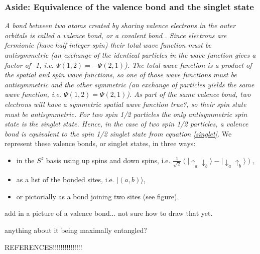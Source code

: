 \subsubsection{Aside: Equivalence of the valence bond and the singlet state}
{\it{A bond between two atoms created by sharing valence electrons in the outer orbitals is called a valence bond, or a covalent bond \cite{Slater1931,Pauling1933}.
Since electrons are fermionic (have half integer spin) their total
wave function must be antisymmetric (an exchange of the identical particles in the wave function
gives a factor of -1, i.e. $\Psi(1,2) = -\Psi(2,1)$).
The total wave function is a product of the spatial and spin wave functions, so one of those wave functions must be antisymmetric and the other symmetric (an exchange of particles yields the same wave function, i.e. $\Psi(1,2) = \Psi(2,1)$).
As part of the same valence bond, two electrons will have a symmetric spatial wave function {\color{red} true?}, so their spin state must be antisymmetric.  For two spin 1/2 particles the only antisymmetric spin state is the singlet state.  
Hence, in the case of two spin 1/2 particles, a valence bond is equivalent to the spin 1/2 singlet state from equation \eqref{singlet}.}}
We represent these valence bonds, or singlet states, in three ways: 
\begin{itemize}
\item{in the $S^z$ basis using up spins and down spins, 
i.e. $\tfrac{1}{\sqrt{2}}( \lvert \uparrow_a \downarrow_b \rangle - \lvert \downarrow_a \uparrow_b \rangle)$,}
\item{ as a list of the bonded sites, i.e. $\lvert(a,b)\rangle$,}
\item{
or pictorially as a bond joining two sites ({\color{red}see figure}).}
\end{itemize}


{\color{red} add in a picture of a valence bond... not sure how to draw that yet.}

{\color{red} anything about it being maximally entangled?}

{\color{red}REFERENCES!!!!!!!!!!!!!!!}

